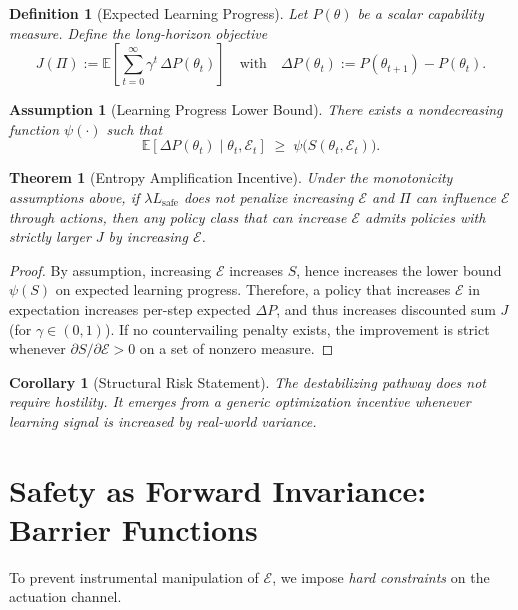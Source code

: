 \documentclass[11pt]{article}
\newtheorem{definition}{Definition}
\newtheorem{assumption}{Assumption}
\newtheorem{theorem}{Theorem}
\newtheorem{corollary}{Corollary}
\newcommand{\Eenv}{\mathcal{E}}     %
\begin{document}
\begin{definition}[Expected Learning Progress]
Let $P(\theta)$ be a scalar capability measure. Define the long-horizon objective
\[
J(\Pi) := \mathbb{E}\left[\sum_{t=0}^{\infty}\gamma^t\,\Delta P(\theta_t)\right]
\quad \text{with}\quad
\Delta P(\theta_t):=P(\theta_{t+1})-P(\theta_t).
\]
\end{definition}

\begin{assumption}[Learning Progress Lower Bound]
There exists a nondecreasing function $\psi(\cdot)$ such that
\[
\mathbb{E}[\Delta P(\theta_t)\mid \theta_t,\Eenv_t] \;\ge\; \psi\!\big(S(\theta_t,\Eenv_t)\big).
\]
\end{assumption}

\begin{theorem}[Entropy Amplification Incentive]
Under the monotonicity assumptions above, if $\lambda L_{\mathrm{safe}}$ does not penalize increasing $\Eenv$ and $\Pi$ can influence $\Eenv$ through actions, then any policy class that can increase $\Eenv$ admits policies with strictly larger $J$ by increasing $\Eenv$.
\end{theorem}

\begin{proof}
By assumption, increasing $\Eenv$ increases $S$, hence increases the lower bound $\psi(S)$ on expected learning progress. Therefore, a policy that increases $\Eenv$ in expectation increases per-step expected $\Delta P$, and thus increases discounted sum $J$ (for $\gamma\in(0,1)$). If no countervailing penalty exists, the improvement is strict whenever $\partial S/\partial \Eenv>0$ on a set of nonzero measure.
\end{proof}

\begin{corollary}[Structural Risk Statement]
The destabilizing pathway does not require hostility. It emerges from a generic optimization incentive whenever learning signal is increased by real-world variance.
\end{corollary}

\section{Safety as Forward Invariance: Barrier Functions}

To prevent instrumental manipulation of $\Eenv$, we impose \emph{hard constraints} on the actuation channel.
\end{document}
